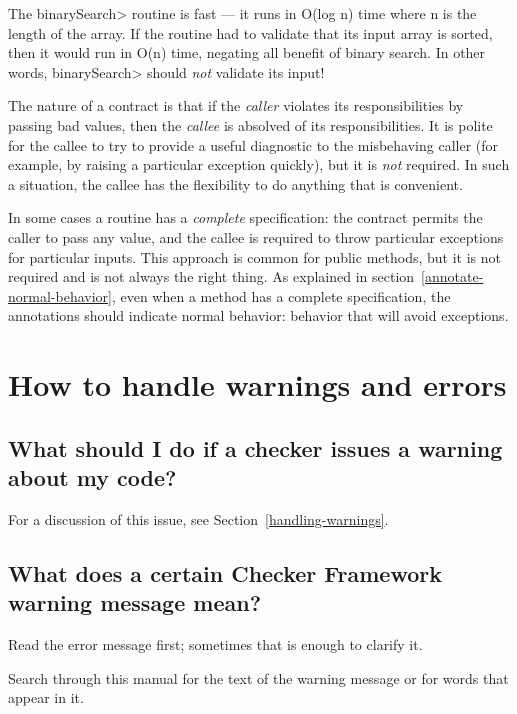 The \<binarySearch> routine is fast --- it runs in O(log n) time where n is
the length of the array.  If the routine had to validate that its input
array is sorted, then it would run in O(n) time, negating all benefit of
binary search.  In other words, \<binarySearch> should \emph{not} validate
its input!

The nature of a contract is that if the \emph{caller} violates its
responsibilities by passing bad values, then the \emph{callee} is absolved
of its responsibilities.  It is polite for the callee to try to provide a
useful diagnostic to the misbehaving caller (for example, by raising a
particular exception quickly), but it is \emph{not} required.  In such a
situation, the callee has the flexibility to do anything that is
convenient.

In some cases a routine has a \emph{complete} specification:  the contract
permits the caller to pass any value, and the callee is required to throw
particular exceptions for particular inputs.  This approach is common for
public methods, but it is not required and is not always the right thing.
As explained in section~\ref{annotate-normal-behavior}, even when a method
has a complete specification, the annotations should indicate normal
behavior:  behavior that will avoid exceptions.



\section{How to handle warnings and errors\label{faq-warnings-section}}

\subsection{What should I do if a checker issues a warning about my code?\label{faq-handling-warnings}}

For a discussion of this issue, see Section~\ref{handling-warnings}.


\subsection{What does a certain Checker Framework warning message mean?\label{faq-interpreting-warnings}}

Read the error message first; sometimes that is enough to clarify it.

Search through this manual for the text of the warning message or for words
that appear in it.

